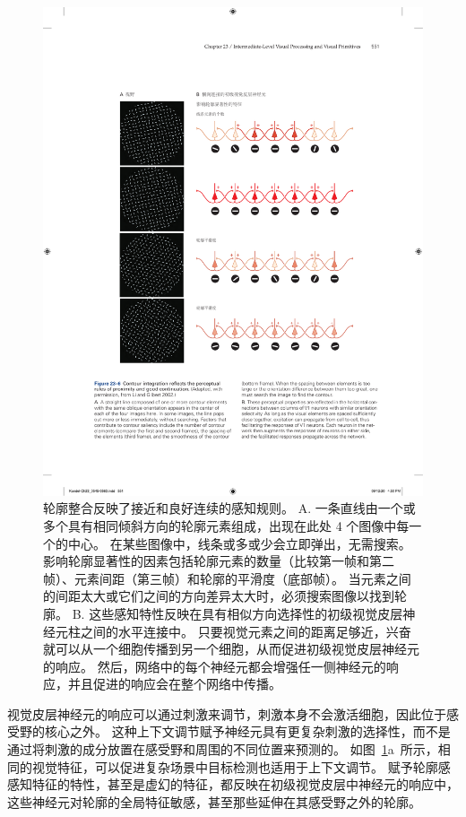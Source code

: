 \begin{figure}[htbp]
	\centering
	\includegraphics[width=1.0\linewidth]{chap23/fig_23_6}
	\caption{轮廓整合反映了接近和良好连续的感知规则\cite{li2002global}。
		A. 一条直线由一个或多个具有相同倾斜方向的轮廓元素组成，出现在此处 4 个图像中每一个的中心。
		在某些图像中，线条或多或少会立即弹出，无需搜索。
		影响轮廓显著性的因素包括轮廓元素的数量（比较第一帧和第二帧）、元素间距（第三帧）和轮廓的平滑度（底部帧）。
		当元素之间的间距太大或它们之间的方向差异太大时，必须搜索图像以找到轮廓。
		B. 这些感知特性反映在具有相似方向选择性的初级视觉皮层神经元柱之间的水平连接中。
		只要视觉元素之间的距离足够近，兴奋就可以从一个细胞传播到另一个细胞，从而促进初级视觉皮层神经元的响应。
		然后，网络中的每个神经元都会增强任一侧神经元的响应，并且促进的响应会在整个网络中传播。}
	\label{fig:23_6}
\end{figure}


视觉皮层神经元的响应可以通过刺激来调节，刺激本身不会激活细胞，因此位于感受野的核心之外。
这种上下文调节赋予神经元具有更复杂刺激的选择性，而不是通过将刺激的成分放置在感受野和周围的不同位置来预测的。
如图~\ref{fig:23_6}a~所示，相同的视觉特征，可以促进复杂场景中目标检测也适用于上下文调节。
赋予轮廓感感知特征的特性，甚至是虚幻的特征，都反映在初级视觉皮层中神经元的响应中，这些神经元对轮廓的全局特征敏感，甚至那些延伸在其感受野之外的轮廓。


